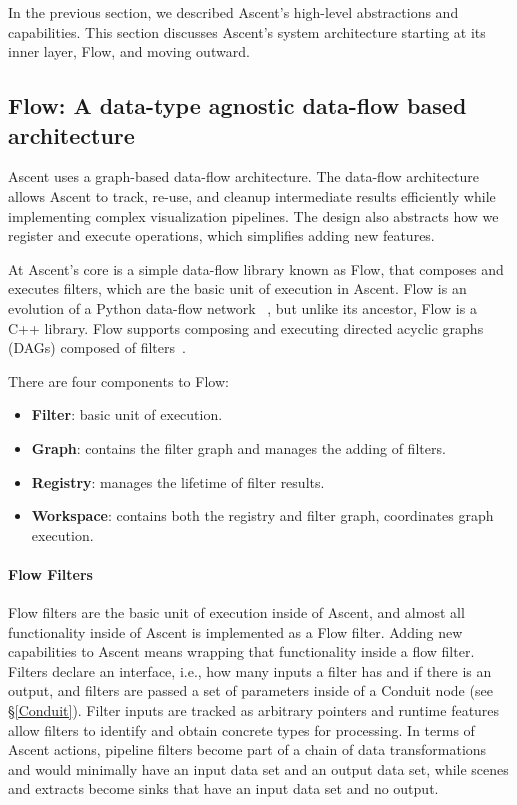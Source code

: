 In the previous section, we described Ascent's high-level abstractions and
capabilities.
%
This section discusses Ascent's system architecture starting at its inner layer, Flow,
and moving outward.

\subsection{Flow: A data-type agnostic data-flow based architecture}
\label{sec:flow}
Ascent uses a graph-based data-flow architecture.
The data-flow architecture allows Ascent to track, re-use, and cleanup intermediate
results efficiently while implementing complex visualization pipelines.
The design also abstracts how we register and execute operations,
which simplifies adding new features.

At Ascent's core is a simple data-flow library known as Flow, that
composes and executes filters, which are the basic unit of execution in Ascent.
%
Flow is an evolution of a Python data-flow network
~\cite{flow_reference}, but unlike its ancestor, Flow is a C++
library.
%
Flow supports composing and executing directed acyclic graphs
(DAGs) composed of filters~\cite{LarsenAscent}.

There are four components to Flow:
\begin{itemize}
  \item \textbf{Filter}: basic unit of execution.
  \item \textbf{Graph}: contains the filter graph and manages the adding of
filters.
  \item \textbf{Registry}: manages the lifetime of filter results.
  \item \textbf{Workspace}: contains both the registry and filter graph,
coordinates graph execution.
\end{itemize}

\paragraph{Flow Filters}
Flow filters are the basic unit of execution inside of Ascent, and
almost all functionality inside of Ascent is implemented as a Flow filter.
%
Adding new capabilities to Ascent means wrapping that functionality inside
a flow filter.
%
Filters declare an interface, i.e., how many inputs a filter has and
if there is an output, and filters are passed a set of parameters inside
of a Conduit node (see \S\ref{Conduit}).
%
Filter inputs are tracked as arbitrary pointers and runtime features allow
filters to identify and obtain concrete types for processing.
%
In terms of Ascent actions, pipeline filters become part of a chain of
data transformations and would minimally have an input
data set and an output data set, while scenes and extracts
become sinks that have an input data set and no output.
%

